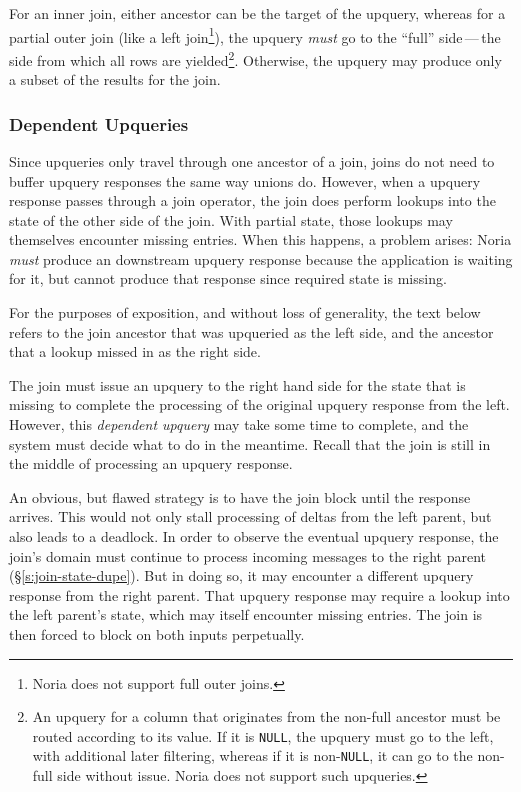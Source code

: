 For an inner join, either ancestor can be the target of the upquery, whereas for
a partial outer join (like a left join\footnote{Noria does not support full
outer joins.}), the upquery \emph{must} go to the ``full'' side\,---\,the side
from which all rows are yielded\footnote{An upquery for a column that originates
from the non-full ancestor must be routed according to its value. If it is
\texttt{NULL}, the upquery must go to the left, with additional later filtering,
whereas if it is non-\texttt{NULL}, it can go to the non-full side without
issue. Noria does not support such upqueries.}. Otherwise, the upquery may
produce only a subset of the results for the join.

\subsubsection{Dependent Upqueries}

Since upqueries only travel through one ancestor of a join, joins do not need to
buffer upquery responses the same way unions do. However, when a upquery
response passes through a join operator, the join does perform lookups into the
state of the other side of the join. With partial state, those lookups may
themselves encounter missing entries. When this happens, a problem arises: Noria
\emph{must} produce an downstream upquery response because the application is
waiting for it, but cannot produce that response since required state is
missing.

For the purposes of exposition, and without loss of generality, the text below
refers to the join ancestor that was upqueried as the left side, and the
ancestor that a lookup missed in as the right side.

The join must issue an upquery to the right hand side for the state that is
missing to complete the processing of the original upquery response from the
left. However, this \textit{dependent upquery} may take some time to complete,
and the system must decide what to do in the meantime. Recall that the join is
still in the middle of processing an upquery response.

An obvious, but flawed strategy is to have the join block until the response
arrives. This would not only stall processing of deltas from the left parent,
but also leads to a deadlock. In order to observe the eventual upquery response,
the join's domain must continue to process incoming messages to the right parent
(\S\ref{s:join-state-dupe}). But in doing so, it may encounter a different
upquery response from the right parent. That upquery response may require a
lookup into the left parent's state, which may itself encounter missing entries.
The join is then forced to block on both inputs perpetually.


